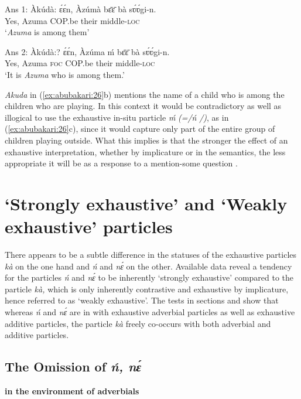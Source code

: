 \documentclass[output=paper
,newtxmath
,modfonts
,nonflat]{langsci/langscibook}
\begin{document}
\ex\label{ex:abubakari:26b} 
Ans 1: Àkúdà: \gll ɛ́ɛ́n,  Àzúmà  bɛ̄ɛ̄    bà sʋ́ʋ́gi-n. \\
Yes,  Azuma  COP.be    their middle-\textsc{loc}\\
\glt ‘\textit{Azuma} is among them’
 
\ex\label{ex:abubakari:26c}
Ans 2: Àkúdà:? \gll ɛ́ɛ́n,  Àzúma  ḿ  bɛ̄ɛ̄ bà  sʋ́ʋ́gi-n.\\
Yes,  Azuma  \textsc{foc}  COP.be   their  middle-\textsc{loc}\\
\glt ‘It is \textit{Azuma} who is among them.’
\z
\z

\textit{Akuda} in (\ref{ex:abubakari:26}b) mentions the name of a child who is among the children who are playing. In this context it would be contradictory as well as illogical to use the exhaustive in-situ  particle \textit{\'{m} } \textit{(=/\'{n} }\textit{/)}, as in (\ref{ex:abubakari:26}c), since it would capture only part of the entire group of children playing outside. What this implies is that the stronger the effect of an exhaustive  interpretation, whether by implicature or in the semantics, the less appropriate it will be as a response to a mention-some question \citep[see][10]{vanderWal2013}.

\section{‘Strongly exhaustive’ and ‘Weakly exhaustive’ particles}

There appears to be a subtle difference in the statuses of the exhaustive particles \textit{kà} on the one hand and \textit{ń} and \textit{nɛ́} on the other. Available data reveal a tendency for the particles \textit{ń} and \textit{nɛ́} to be inherently ‘strongly exhaustive’ compared to the particle \textit{kà,} which is only inherently contrastive and exhaustive by implicature, hence referred to as ‘weakly exhaustive’. The tests in sections  and  show that whereas \textit{ń} and \textit{nɛ́} are in  with exhaustive adverbial particles as well as exhaustive additive particles, the particle \textit{kà} freely co-occurs with both adverbial and additive particles. 

 
\subsection{The Omission of \textit{ń, nɛ́}} \textbf{in the environment of adverbials}\label{sec:abubakari:4.1}
 
\end{document}
